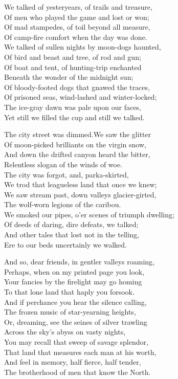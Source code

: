 
\begin{poemblock}
We talked of yesteryears, of trails and treasure,\\
\idt Of men who played the game and lost or won;\\
Of mad stampedes, of toil beyond all measure,\\
\idt Of camp-fire comfort when the day was done.\\
We talked of sullen nights by moon-dogs haunted,\\
\idt Of bird and beast and tree, of rod and gun;\\
Of boat and tent, of hunting-trip enchanted\\
\idt Beneath the wonder of the midnight sun;\\
Of bloody-footed dogs that gnawed the traces,\\
\idt Of prisoned seas, wind-lashed and winter-locked;\\
The ice-gray dawn was pale upon our faces,\\
\idt Yet still we filled the cup and still we talked.

The city street was dimmed.\idt We saw the glitter\\
\idt Of moon-picked brilliants on the virgin snow,\\
And down the drifted canyon heard the bitter,\\
\idt Relentless slogan of the winds of woe.\\
The city was forgot, and, parka-skirted,\\
\idt We trod that leagueless land that once we knew;\\
We saw stream past, down valleys glacier-girted,\\
\idt The wolf-worn legions of the caribou.\\
We smoked our pipes, o'er scenes of triumph dwelling;\\
\idt Of deeds of daring, dire defeats, we talked;\\
And other tales that lost not in the telling,\\
\idt Ere to our beds uncertainly we walked.

And so, dear friends, in gentler valleys roaming,\\
\idt Perhaps, when on my printed page you look,\\
Your fancies by the firelight may go homing\\
\idt To that lone land that haply you forsook.\\
And if perchance you hear the silence calling,\\
\idt The frozen music of star-yearning heights,\\
Or, dreaming, see the seines of silver trawling\\
\idt Across the sky's abyss on vasty nights,\\
You may recall that sweep of savage splendor,\\
\idt That land that measures each man at his worth,\\
And feel in memory, half fierce, half tender,\\
\idt  The brotherhood of men that know the North.
\end{poemblock}
